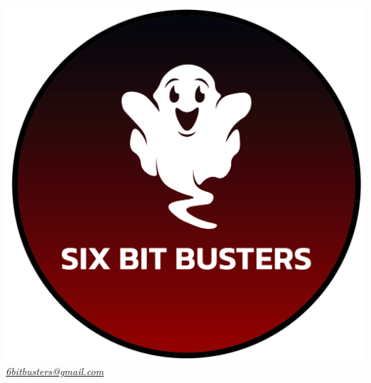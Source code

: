 \thispagestyle{empty}
\renewcommand{\arraystretch}{1.0}


\begin{titlepage}
	\begin{center}
	    
	
		
	\includegraphics[scale = 0.5]{template/images/logo-circle.png}
	\\[1cm]
	\href{mailto:6bitbusters@gmail.com}		      	
	{\large{\textit{6bitbusters@gmail.com} } }\\[1cm]
	

\end{center}
\end{titlepage}
